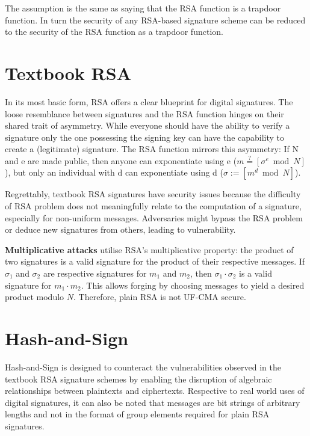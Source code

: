 \documentclass[]{final_report}
\theoremstyle{definition}
\begin{document}
The assumption is the same as saying that the RSA function is a trapdoor function. In turn the security of any RSA-based signature scheme can be reduced to the security of the RSA function as a trapdoor function.


\section{Textbook RSA}
In its most basic form, RSA offers a clear blueprint for digital signatures. The loose resemblance between signatures and the RSA function hinges on their shared trait of asymmetry. While everyone should have the ability to verify a signature only the one possessing the signing key can have the capability to create a (legitimate) signature. The RSA function mirrors this asymmetry: If N and e are made public, then anyone can exponentiate using e ($m \stackrel{?}{=} [\sigma^e \bmod N]$), but only an individual with d can exponentiate using d ($\sigma := [m^d \bmod N]$). 

Regrettably, textbook RSA signatures have security issues because the difficulty of RSA problem does not meaningfully relate to the computation of a signature, especially for non-uniform messages. Adversaries might bypass the RSA problem or deduce new signatures from others, leading to vulnerability.

\textbf{Multiplicative attacks} utilise RSA's multiplicative property: the product of two signatures is a valid signature for the product of their respective messages. If \( \sigma_{1} \) and \( \sigma_{2} \) are respective signatures for \( m_{1} \) and \( m_{2} \), then \( \sigma_{1} \cdot \sigma_{2} \) is a valid signature for \( m_{1} \cdot m_{2} \). This allows forging by choosing messages to yield a desired product modulo \( N \). Therefore, plain RSA is not UF-CMA secure.

\section{Hash-and-Sign}
\label{def:hashed rsa}
Hash-and-Sign is designed to counteract the vulnerabilities observed in the textbook RSA signature schemes by enabling the disruption of algebraic relationships between plaintexts and ciphertexts. Respective to real world uses of digital signatures, it can also be noted that messages are bit strings of arbitrary lengths and not in the format of group elements required for plain RSA signatures.
\end{document}
